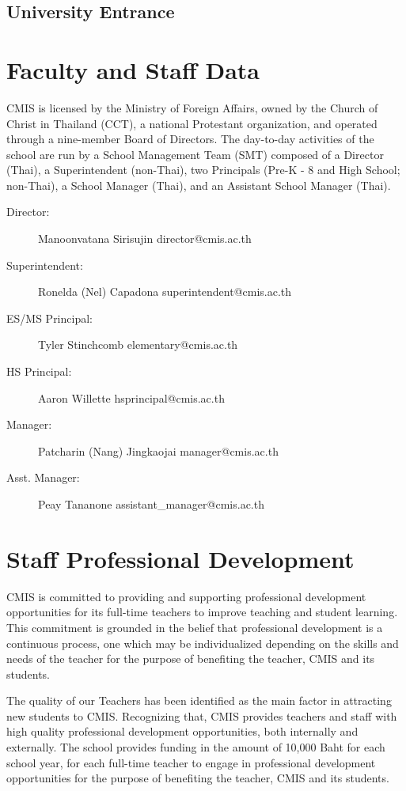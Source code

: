 \documentclass{report}
\begin{document}
\subsection{University Entrance}

\section{Faculty and Staff Data}

CMIS is licensed by the Ministry of Foreign Affairs, owned by the Church of Christ in Thailand (CCT), a national Protestant organization, and operated through a nine-member Board of Directors.  The day-to-day activities of the school are run by a School Management Team (SMT) composed of a Director (Thai), a Superintendent (non-Thai), two Principals (Pre-K - 8 and High School; non-Thai), a School Manager (Thai), and an Assistant School Manager (Thai). 

\begin{description}
\item[Director:]  Manoonvatana Sirisujin         		director@cmis.ac.th
\item[Superintendent:]  Ronelda (Nel) Capadona	superintendent@cmis.ac.th
\item[ES/MS Principal:]  Tyler Stinchcomb	     	elementary@cmis.ac.th
\item[HS Principal:]  Aaron Willette		   	hsprincipal@cmis.ac.th	
\item[Manager:]  Patcharin (Nang) Jingkaojai		manager@cmis.ac.th
\item[Asst. Manager:]  Peay Tananone			assistant\_manager@cmis.ac.th 
\end{description}


\section{Staff Professional Development}

CMIS is committed to providing and supporting professional development opportunities for its full-time teachers to improve teaching and student learning. This commitment is grounded in the belief that professional development is a continuous process, one which may be individualized depending on the skills and needs of the teacher for the purpose of benefiting the teacher, CMIS and its students.  

The quality of our Teachers has been identified as the main factor in attracting new students to CMIS.  Recognizing that, CMIS provides teachers and staff with high quality professional development opportunities, both internally and externally.  The school provides funding in the amount of 10,000 Baht for each school year, for each full-time teacher to engage in professional development opportunities for the purpose of benefiting the teacher, CMIS and its students.  
\end{document}
